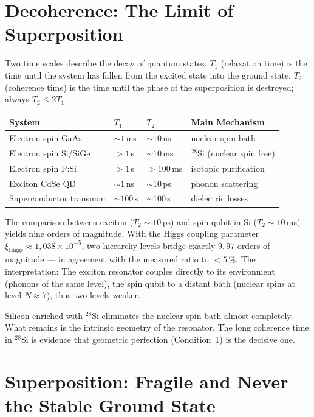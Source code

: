 \section{Decoherence: The Limit of Superposition}

Two time scales describe the decay of quantum states.
$T_1$ (relaxation time) is the time until the system has fallen from the excited
state into the ground state. $T_2$ (coherence time) is the
time until the phase of the superposition is destroyed; always $T_2\le2T_1$.

\begin{center}
\small
\begin{tabular}{p{3.2cm}p{1.3cm}p{1.3cm}p{3.3cm}}
\toprule
\textbf{System} & \textbf{$T_1$} & \textbf{$T_2$} & \textbf{Main Mechanism} \\
\midrule
Electron spin GaAs & $\sim1$\,ms & $\sim10$\,ns & nuclear spin bath \\
Electron spin Si/SiGe & $>1$\,s & $\sim10$\,ms & ${}^{28}$Si (nuclear spin free) \\
Electron spin P:Si & $>1$\,s & $>100$\,ms & isotopic purification \\
Exciton CdSe QD & $\sim1$\,ns & $\sim10$\,ps & phonon scattering \\
Superconductor transmon & $\sim100$\,\textmu{}s & $\sim100$\,\textmu{}s & dielectric losses \\
\bottomrule
\end{tabular}
\end{center}

The comparison between exciton ($T_2\sim10$\,ps) and spin qubit in Si
($T_2\sim10$\,ms) yields nine orders of magnitude. With the Higgs coupling
parameter $\xi_{\mathrm{Higgs}}\approx1{,}038\times10^{-5}$, two hierarchy levels
bridge exactly $9{,}97$ orders of magnitude --- in agreement
with the measured ratio to $<5\,\%$. The interpretation: The
exciton resonator couples directly to its environment (phonons of the same
level), the spin qubit to a distant bath (nuclear spins at level
$N\approx7$), thus two levels weaker.

Silicon enriched with ${}^{28}$Si eliminates the nuclear spin bath almost
completely. What remains is the intrinsic geometry of the
resonator. The long coherence time in ${}^{28}$Si is evidence that
geometric perfection (Condition~1) is the decisive one.

\section{Superposition: Fragile and Never the Stable Ground State}

